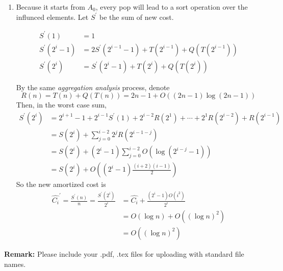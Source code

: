 \documentclass[12pt,a4paper]{article}
\makeatletter
\newtheorem*{solution}{Solution}
\theoremstyle{definition}
\renewenvironment{solution}[1][Solution] {\par\pushQED{\qed}\normalfont\topsep6\p@\@plus6\p@\relax\trivlist\item[\hskip\labelsep\bfseries#1\@addpunct{.}]\ignorespaces}{\popQED\endtrivlist\@endpefalse} \makeatother
\makeatother
\begin{document}
\begin{enumerate}
\begin{enumerate}
\begin{solution}
			Because it starts from $A_0$, every pop will lead to a sort operation over the influnced elements. Let $S^\prime$ be the sum of new cost.

			\begin{align*}
				S^\prime(1) &= 1\\
				S^\prime(2^i-1) &= 2S^\prime(2^{i-1}-1) + T(2^{i-1}) + Q(T(2^{i-1}))\\
				S^\prime(2^i) &= S^\prime(2^{i}-1) + T(2^i)+ Q(T(2^i))
			\end{align*}

			By the same \emph{aggregation analysis} process, denote 
			\begin{equation*}
				R(n)=T(n)+Q(T(n))=2n-1+O((2n-1)\log(2n-1))
			\end{equation*}
			Then, in the worst case sum,
			\begin{align*}
				S^\prime(2^i) &= 
				2^{i+1} - 1 + 2^{i-1}S^\prime(1) + 2^{i-2}R(2^1) + \cdots + 2^1R(2^{i-2}) +R(2^{i-1})\\
				&= S(2^i) + \sum_{j=0}^{i-2} 2^j R(2^{i-1-j})\\
				&= S(2^i) + (2^i-1)\sum_{j=0}^{i-2} O(\log(2^{i-j}-1))\\
				&= S(2^i) + O\left((2^i-1)\frac{(i+2)(i-1)}{2}\right)
			\end{align*}
			So the new amortized cost is
			\begin{align*}
				\hat{C_i}^\prime = \frac{S^\prime(n)}{n}= \frac{S^\prime(2^i)}{2^i} &= \hat{C_i} +\frac{(2^i-1)O(i^2)}{2^i} \\&= O(\log n) + O((\log n)^2)\\&=O((\log n)^2)
			\end{align*}

		\end{solution}
    \end{enumerate}
	
\end{enumerate}



\textbf{Remark:} Please include your .pdf, .tex files for uploading with standard file names.


\end{document}
